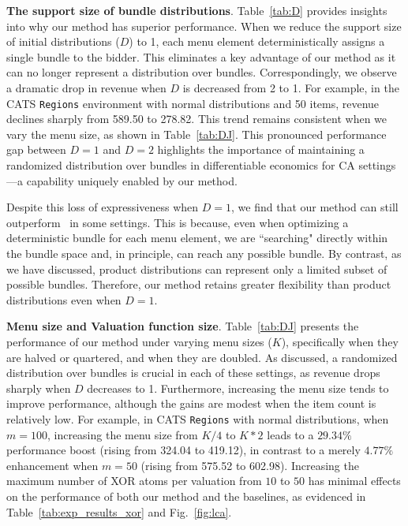 \textbf{The support size of bundle distributions}. Table~\ref{tab:D} provides insights into why our method has superior performance. When we reduce the support size of initial distributions ($D$) to 1, each menu element deterministically assigns a single bundle to the bidder. This eliminates a key advantage of our method as it can no longer represent a distribution over bundles. Correspondingly, we observe a dramatic drop in revenue when $D$ is decreased from 2 to 1. For example, in the CATS \texttt{Regions} environment with normal distributions and 50 items, revenue declines sharply from 589.50 to 278.82. This trend remains consistent when we vary the menu size, as shown in Table~\ref{tab:DJ}. This pronounced performance gap between $D=1$ and $D=2$ highlights the importance of maintaining a randomized distribution over bundles in differentiable economics for CA settings---a capability uniquely enabled by our method.

Despite this loss of expressiveness when $D=1$, we find that our method can still outperform \bundle~in some settings. This is because, even when optimizing a deterministic bundle for each menu element, we are ``searching" directly within the bundle space and, in principle, can reach any possible bundle. By contrast, as we have discussed, product distributions can represent only a limited subset of possible bundles. Therefore, our method retains greater flexibility than product distributions even when $D=1$.

\textbf{Menu size and Valuation function size}. Table~\ref{tab:DJ} presents the performance of our method under varying menu sizes ($K$), specifically when they are halved or quartered, and when they are doubled. As discussed, a randomized distribution over bundles is crucial in each of these settings, as revenue drops sharply when $D$ decreases to 1. Furthermore, increasing the menu size tends to improve performance, although the gains are modest when the item count is relatively low. For example, in CATS \texttt{Regions} with normal distributions, when $m=100$, increasing the menu size from $K/4$ to $K*2$ leads to a $29.34\%$ performance boost (rising from 324.04 to 419.12), in contrast to a merely $4.77\%$ enhancement when $m=50$ (rising from 575.52 to 602.98). Increasing the maximum number of XOR atoms per valuation from $10$ to $50$ has minimal effects on the performance of both our method and the baselines, as evidenced in Table~\ref{tab:exp_results_xor} and Fig.~\ref{fig:lca}.


